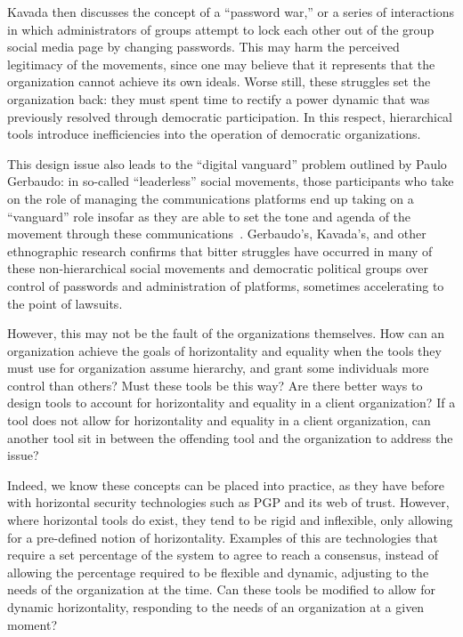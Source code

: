 Kavada then discusses the concept of a ``password war,'' or a series of
interactions in which administrators of groups attempt to lock each other out of
the group social media page by changing passwords. This may harm the perceived
legitimacy of the movements, since one may believe that it represents that the
organization cannot achieve its own ideals. Worse still, these struggles set
the organization back: they must spent time to rectify a power dynamic that was
previously resolved through democratic participation. In this respect,
hierarchical tools introduce inefficiencies into the operation of democratic
organizations.

This design issue also leads to the ``digital vanguard'' problem outlined by
Paulo Gerbaudo: in so-called ``leaderless'' social movements, those participants
who take on the role of managing the communications platforms end up taking on a
``vanguard'' role insofar as they are able to set the tone and agenda of the
movement through these communications~\cite{gerbaudo2017social}. Gerbaudo’s,
Kavada's, and other %
ethnographic research confirms that bitter struggles have occurred in many of
these non-hierarchical social movements and democratic political groups over 
control of passwords and administration of platforms, sometimes accelerating to
the point of lawsuits.

However, this may not be the fault of the organizations themselves. How can an 
organization achieve the goals of horizontality and equality when the tools they
must use for organization assume hierarchy, and grant some individuals more
control than others? Must these tools be this way? Are there better ways to
design tools to account for horizontality and equality in a client organization?
If a tool does not allow for horizontality and equality in a client
organization, can another tool sit in between the offending tool and the
organization to address the issue? 

Indeed, we know these concepts can be placed into practice, as they have before
with horizontal security technologies such as PGP and its web of trust. However,
where horizontal tools do exist, they tend to be rigid and inflexible, only
allowing for a pre-defined notion of horizontality. Examples of this are
technologies that require a set percentage of the system to agree to reach a
consensus, instead of allowing the percentage required to be flexible and
dynamic, adjusting to the needs of the organization at the time. Can these tools
be modified to allow for dynamic horizontality, responding to the needs of an
organization at a given moment?

